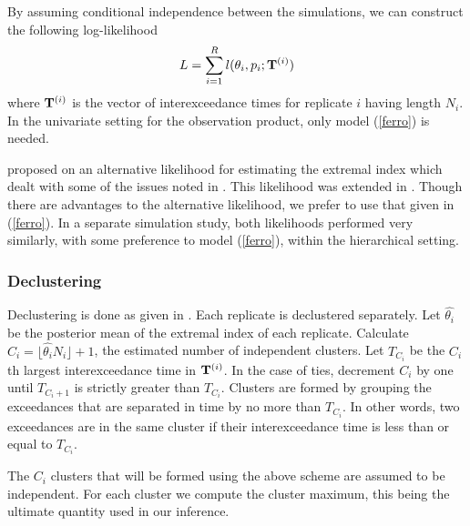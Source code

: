 By assuming conditional independence between the simulations, we can construct the following log-likelihood
\begin{align}
L = \sum_{i=1}^R l(\theta_i, p_i; \mathbf{\bm{T}}^{(i)}) \label{hiertheta}
\end{align}
where $\mathbf{\bm{T}}^{(i)}$ is the vector of interexceedance times for replicate $i$ having length $N_i$. In the univariate setting for the observation product, only model (\ref{ferro}) is needed.

\cite{suveges2007likelihood} proposed on an alternative likelihood for estimating the extremal index which dealt with some of the issues noted in \cite{ferro2003inference}. This likelihood was extended in \cite{suveges2010model}. Though there are advantages to the alternative likelihood, we prefer to use that given in (\ref{ferro}). In a separate simulation study, both likelihoods performed very similarly, with some preference to model (\ref{ferro}), within the hierarchical setting.

\subsubsection{Declustering}

Declustering is done as given in \cite{ferro2003inference}. Each replicate is declustered separately. Let $\hat{\theta_i}$ be the posterior mean of the extremal index of each replicate. Calculate $C_i=\lfloor \hat{\theta_i} N_i \rfloor + 1$, the estimated number of independent clusters. Let $T_{C_i}$ be the $C_i$th largest interexceedance time in $\mathbf{\bm{T}}^{(i)}$. In the case of ties, decrement $C_i$ by one until $T_{C_i+1}$ is strictly greater than $T_{C_i}$. Clusters are formed by grouping the exceedances that are separated in time by no more than $T_{C_i}$. In other words, two exceedances are in the same cluster if their interexceedance time is less than or equal to $T_{C_i}$.

The $C_i$ clusters that will be formed using the above scheme are assumed to be independent. For each cluster we compute the cluster maximum, this being the ultimate quantity used in our inference.

